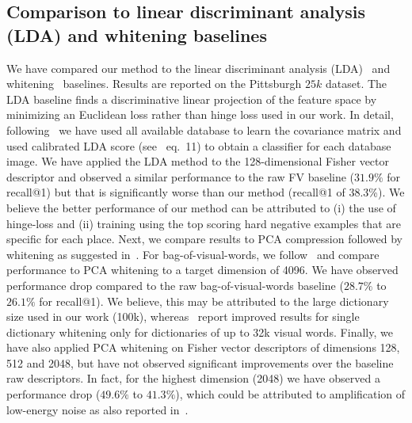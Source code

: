     \subsection{\textcolor{petr}{Comparison to linear discriminant analysis (LDA) and whitening baselines}}
\label{sec:LDA}
    \textcolor{petr}{
      We have compared our method to the linear discriminant analysis (LDA)~\cite{Aubry13,Hariharan12,Gharbi12} and whitening~\cite{JegouChum12} baselines. Results are reported on the Pittsburgh $25k$ dataset. The LDA baseline finds a discriminative linear projection of the feature space by minimizing an Euclidean loss rather than hinge loss used in our work. In detail, following~\cite{Aubry13} we have used all available database to learn the covariance matrix and used calibrated LDA score (see~\cite{Aubry13} eq.~11) to obtain a classifier for each database image.  
  We have applied the LDA method to the 128-dimensional Fisher vector descriptor and observed a similar performance to the raw FV baseline 
  ($31.9\%$ for recall@1) but that is significantly worse than our method (recall@1 of 38.3\%). We believe the better performance of our method can be attributed to (i) the use of hinge-loss and (ii) training using the top scoring hard negative examples that are specific for each place.  
      Next, we compare results to PCA compression followed by whitening as suggested in~\cite{JegouChum12}. For bag-of-visual-words, we follow~\cite{JegouChum12} and compare performance to PCA whitening to a target dimension of 4096. We have observed performance drop compared to the raw bag-of-visual-words baseline ($28.7\%$ to $26.1\%$ for recall@1). We believe, this may be attributed to the large dictionary size used in our work (100k), whereas~\cite{JegouChum12} report improved results for single dictionary whitening only for dictionaries of up to 32k visual words.
      Finally,  we have also applied PCA whitening on Fisher vector descriptors of dimensions 128, 512 and 2048, but have not observed significant improvements over the baseline raw descriptors. In fact, for the highest dimension (2048) we have observed a performance drop ($49.6\%$ to $41.3\%$), which could be attributed to amplification of low-energy noise as also reported in~\cite{JegouChum12}. 
      }
